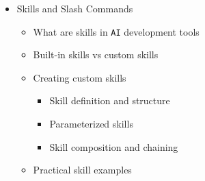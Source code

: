 \documentclass[
]{article}
\providecommand{\tightlist}{%
  \setlength{\itemsep}{0pt}\setlength{\parskip}{0pt}}
\begin{document}
\begin{itemize}
\begin{itemize}
    \begin{itemize}
    \tightlist
    \item
      Filesystem server
    \item
      \texttt{GitHub} server
    \item
      Database servers (\texttt{PostgreSQL}, \texttt{SQLite})
    \item
      Slack, \texttt{Jira}, Linear servers
    \item
      Browser automation servers (\texttt{Puppeteer},
      \texttt{Playwright})
    \end{itemize}
  \item
    Building custom \texttt{MCP} servers

    \begin{itemize}
    \tightlist
    \item
      Server implementation in \texttt{Python} and \texttt{TypeScript}
    \item
      Exposing project-specific tools and resources
    \item
      Authentication and authorization
    \item
      Deployment and lifecycle management
    \end{itemize}
  \item
    \texttt{MCP} in team environments

    \begin{itemize}
    \tightlist
    \item
      Shared \texttt{MCP} server configurations
    \item
      Central tool registries
    \item
      Security policies and access control
    \end{itemize}
  \end{itemize}
\item
  Skills and Slash Commands

  \begin{itemize}
  \tightlist
  \item
    What are skills in \texttt{AI} development tools
  \item
    Built-in skills vs custom skills
  \item
    Creating custom skills

    \begin{itemize}
    \tightlist
    \item
      Skill definition and structure
    \item
      Parameterized skills
    \item
      Skill composition and chaining
    \end{itemize}
  \item
    Practical skill examples


\end{itemize}
\end{itemize}
\end{document}
